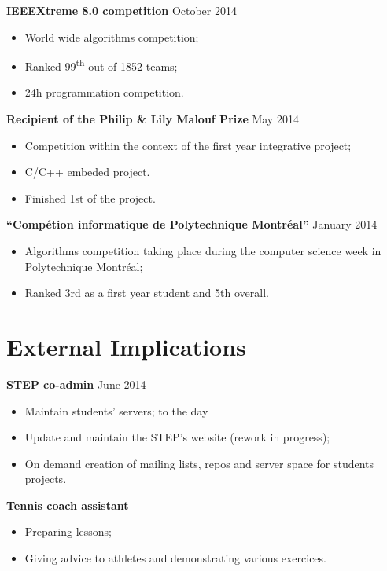 \documentclass[margin]{res}
\begin{document}
\begin{resume}
  {\bf IEEEXtreme 8.0 competition} \hfill October 2014
  \begin{itemize} \itemsep -2pt
  \item World wide algorithms competition;
  \item Ranked 99\textsuperscript{th} out of 1852 teams;
  \item 24h programmation competition.
  \end{itemize}
  
  {\bf Recipient of the Philip \& Lily Malouf Prize} \hfill May 2014
  \begin{itemize} \itemsep -2pt
  \item Competition within the context of the first year integrative project;
  \item C/C++ embeded project.
  \item Finished 1st of the project.
  \end{itemize}
  
  {\bf ``Comp\'{e}tion informatique de Polytechnique Montr\'{e}al''} \hfill January 2014
  \begin{itemize} \itemsep -2pt
  \item Algorithms competition taking place during the computer science week in Polytechnique  Montr\'{e}al;
  \item Ranked 3rd as a first year student and 5th overall.
  \end{itemize}


  \section{External Implications}
  
  {\bf STEP co-admin} \hfill June 2014 -
  \begin{itemize} \itemsep -2pt
  \item Maintain students' servers; \hfill to the day
  \item Update and maintain the STEP's website (rework in progress);
  \item On demand creation of mailing lists, repos and server space for students projects.
  \end{itemize}
  
  {\bf Tennis coach assistant}
  \begin{itemize} \itemsep -2pt
  \item Preparing lessons;
  \item Giving advice to athletes and demonstrating various exercices.
  \end{itemize}
  

\end{resume}
\end{document}
